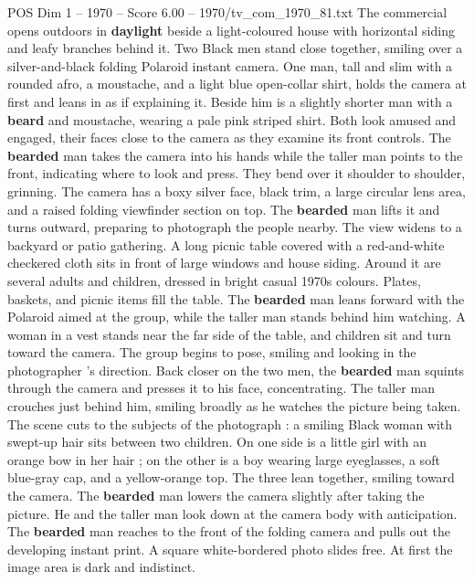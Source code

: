 \begin{textsample}{POS Dim 1 – 1970 – Score 6.00 – 1970/tv\_com\_1970\_81.txt}  \label{ex:f1_pos_065}
The commercial opens outdoors in \textbf{daylight} beside a light-coloured house with horizontal siding and leafy branches behind it.
Two Black men stand close together, smiling over a silver-and-black folding Polaroid instant camera.
One man, tall and slim with a rounded afro, a moustache, and a light blue open-collar shirt, holds the camera at first and leans in as if explaining it.
Beside him is a slightly shorter man with a \textbf{beard} and moustache, wearing a pale pink striped shirt.
Both look amused and engaged, their faces close to the camera as they examine its front controls.
The \textbf{bearded} man takes the camera into his hands while the taller man points to the front, indicating where to look and press.
They bend over it shoulder to shoulder, grinning.
The camera has a boxy silver face, black trim, a large circular lens area, and a raised folding viewfinder section on top.
The \textbf{bearded} man lifts it and turns outward, preparing to photograph the people nearby.
The view widens to a backyard or patio gathering.
A long picnic table covered with a red-and-white checkered cloth sits in front of large windows and house siding.
Around it are several adults and children, dressed in bright casual 1970s colours.
Plates, baskets, and picnic items fill the table.
The \textbf{bearded} man leans forward with the Polaroid aimed at the group, while the taller man stands behind him watching.
A woman in a vest stands near the far side of the table, and children sit and turn toward the camera.
The group begins to pose, smiling and looking in the photographer ’s direction.
Back closer on the two men, the \textbf{bearded} man squints through the camera and presses it to his face, concentrating.
The taller man crouches just behind him, smiling broadly as he watches the picture being taken.
The scene cuts to the subjects of the photograph : a smiling Black woman with swept-up hair sits between two children.
On one side is a little girl with an orange bow in her hair ; on the other is a boy wearing large eyeglasses, a soft blue-gray cap, and a yellow-orange top.
The three lean together, smiling toward the camera.
The \textbf{bearded} man lowers the camera slightly after taking the picture.
He and the taller man look down at the camera body with anticipation.
The \textbf{bearded} man reaches to the front of the folding camera and pulls out the developing instant print.
A square white-bordered photo slides free.
At first the image area is dark and indistinct.

\end{textsample}
